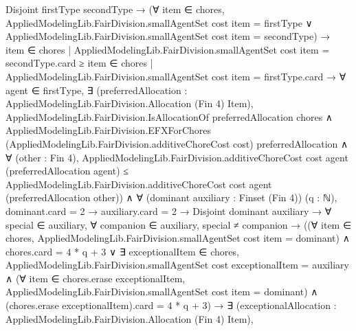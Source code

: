 \documentclass[10pt]{article}
\begin{document}
\begin{ReviewVerbatim}
                        Disjoint firstType secondType →
                          (∀ item ∈ chores,
                              AppliedModelingLib.FairDivision.smallAgentSet cost item = firstType ∨
                                AppliedModelingLib.FairDivision.smallAgentSet cost item = secondType) →
                            {item ∈ chores |
                                    AppliedModelingLib.FairDivision.smallAgentSet cost item = secondType}.card ≥
                                {item ∈ chores |
                                    AppliedModelingLib.FairDivision.smallAgentSet cost item = firstType}.card →
                              ∀ agent ∈ firstType,
                                ∃ (preferredAllocation : AppliedModelingLib.FairDivision.Allocation (Fin 4) Item),
                                  AppliedModelingLib.FairDivision.IsAllocationOf preferredAllocation chores ∧
                                    AppliedModelingLib.FairDivision.EFXForChores
                                        (AppliedModelingLib.FairDivision.additiveChoreCost cost) preferredAllocation ∧
                                      ∀ (other : Fin 4),
                                        AppliedModelingLib.FairDivision.additiveChoreCost cost agent
                                            (preferredAllocation agent) ≤
                                          AppliedModelingLib.FairDivision.additiveChoreCost cost agent
                                            (preferredAllocation other)) ∧
                  ∀ (dominant auxiliary : Finset (Fin 4)) (q : ℕ),
                    dominant.card = 2 →
                      auxiliary.card = 2 →
                        Disjoint dominant auxiliary →
                          ∀ special ∈ auxiliary,
                            ∀ companion ∈ auxiliary,
                              special ≠ companion →
                                ((∀ item ∈ chores, AppliedModelingLib.FairDivision.smallAgentSet cost item = dominant) ∧
                                      chores.card = 4 * q + 3 ∨
                                    ∃ exceptionalItem ∈ chores,
                                      AppliedModelingLib.FairDivision.smallAgentSet cost exceptionalItem = auxiliary ∧
                                        (∀ item ∈ chores.erase exceptionalItem,
                                            AppliedModelingLib.FairDivision.smallAgentSet cost item = dominant) ∧
                                          (chores.erase exceptionalItem).card = 4 * q + 3) →
                                  ∃ (exceptionalAllocation : AppliedModelingLib.FairDivision.Allocation (Fin 4) Item),

\end{ReviewVerbatim}
\end{document}
